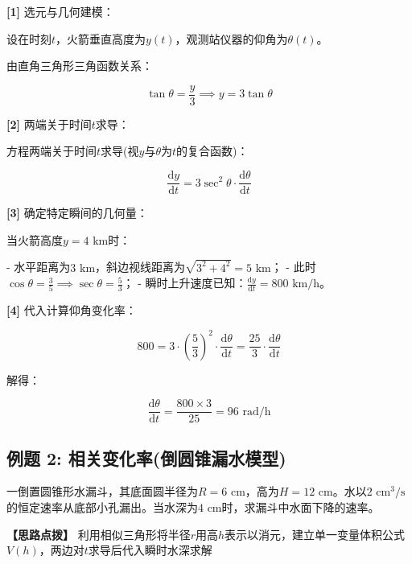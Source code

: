 \documentclass[11pt,a4paper,UTF8]{ctexart}
\begin{document}
\begin{solbox}[分步推导与答题规范]
\textbf{[1]} 选元与几何建模：

设在时刻$t$，火箭垂直高度为$y(t)$，观测站仪器的仰角为$\theta(t)$。

由直角三角形三角函数关系：


\begin{equation*}
\tan\theta = \frac{y}{3} \implies y = 3\tan\theta
\end{equation*}


\textbf{[2]} 两端关于时间$t$求导：

方程两端关于时间$t$求导(视$y$与$\theta$为$t$的复合函数)：


\begin{equation*}
\frac{\mathrm{d}y}{\mathrm{d}t} = 3\sec^2\theta \cdot \frac{\mathrm{d}\theta}{\mathrm{d}t}
\end{equation*}


\textbf{[3]} 确定特定瞬间的几何量：

当火箭高度$y = 4\text{ km}$时：

- 水平距离为$3\text{ km}$，斜边视线距离为$\sqrt{3^2 + 4^2} = 5\text{ km}$；
- 此时$\cos\theta = \frac{3}{5} \implies \sec\theta = \frac{5}{3}$；
- 瞬时上升速度已知：$\frac{\mathrm{d}y}{\mathrm{d}t} = 800\text{ km/h}$。

\textbf{[4]} 代入计算仰角变化率：


\begin{equation*}
800 = 3 \cdot \left(\frac{5}{3}\right)^2 \cdot \frac{\mathrm{d}\theta}{\mathrm{d}t} = \frac{25}{3} \cdot \frac{\mathrm{d}\theta}{\mathrm{d}t}
\end{equation*}


解得：


\begin{equation*}
\frac{\mathrm{d}\theta}{\mathrm{d}t} = \frac{800 \times 3}{25} = 96\text{ rad/h}
\end{equation*}

\end{solbox}


\subsection{例题 2: 相关变化率(倒圆锥漏水模型)}

一倒置圆锥形水漏斗，其底面圆半径为$R = 6\text{ cm}$，高为$H = 12\text{ cm}$。水以$2\text{ cm}^3\text{/s}$的恒定速率从底部小孔漏出。当水深为$4\text{ cm}$时，求漏斗中水面下降的速率。

\textbf{\color{DeepPurple}【思路点拨】} 利用相似三角形将半径$r$用高$h$表示以消元，建立单一变量体积公式$V(h)$，两边对$t$求导后代入瞬时水深求解
\end{document}
